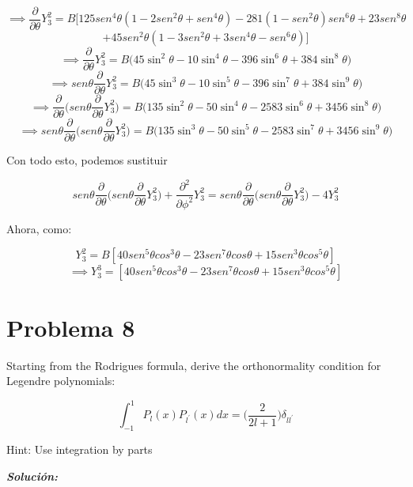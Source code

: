 \documentclass[10pt]{article}
\begin{document}
$$\implies \frac{\partial}{\partial \theta}Y_{3}^{2}=B[125sen^{4}\theta (1-2sen^{2}\theta+sen^{4}\theta)-281(1-sen^{2}\theta) sen^{6}\theta +23 sen^{8}\theta $$
$$+45sen^{2}\theta (1-3sen^{2}\theta+3sen^{4}\theta-sen^{6}\theta ) ]$$
$$ \implies \frac{\partial}{\partial \theta}Y_{3}^{2} = B \big( 45\sin^{2}\theta - 10\sin^{4}\theta - 396\sin^{6}\theta + 384\sin^{8}\theta \big)$$
$$ \implies sen\theta \frac{\partial}{\partial \theta}Y_{3}^{2} = B \big( 45\sin^{3}\theta - 10\sin^{5}\theta - 396\sin^{7}\theta + 384\sin^{9}\theta \big)$$
$$ \implies \frac{\partial}{\partial \theta}\bigg(sen\theta \frac{\partial}{\partial \theta}Y_{3}^{2}\bigg) = B \big( 135\sin^{2}\theta - 50\sin^{4}\theta - 2583\sin^{6}\theta + 3456\sin^{8}\theta \big)$$
$$ \implies sen\theta\frac{\partial}{\partial \theta}\bigg(sen\theta \frac{\partial}{\partial \theta}Y_{3}^{2}\bigg) = B \big( 135\sin^{3}\theta - 50\sin^{5}\theta - 2583\sin^{7}\theta + 3456\sin^{9}\theta \big)$$

Con todo esto, podemos sustituir 

$$sen\theta\frac{\partial}{\partial \theta}\bigg(sen\theta \frac{\partial}{\partial \theta}Y_{3}^{2}\bigg)+\frac{\partial^{2}}{\partial \phi^{2}}Y_{3}^{2}=sen\theta\frac{\partial}{\partial \theta}\bigg(sen\theta \frac{\partial}{\partial \theta}Y_{3}^{2}\bigg)-4Y_{3}^{2}$$

Ahora, como:

$$Y_{3}^{2}=B[40sen^{5}\theta cos^{3}\theta-23sen^{7}\theta cos\theta +15sen^{3}\theta cos^{5}\theta]$$
$$\implies Y_{3}^{3}= [40sen^{5}\theta cos^{3}\theta-23sen^{7}\theta cos\theta +15sen^{3}\theta cos^{5}\theta]$$

\section{Problema 8}

\medskip
\begin{tcolorbox}[colback=gray!10, colframe=black, title=Problem 8]

Starting from the Rodrigues formula, derive the orthonormality
condition for Legendre polynomials:

$$\int_{-1}^{1}P_{l}(x)P_{l^{'}}(x)dx=\bigg( \frac{2}{2l+1} \bigg)\delta_{ll^{'}}$$

Hint: Use integration by parts

\end{tcolorbox}
\medskip


\Large{\textit{\textbf{Solución:}}}
\end{document}
